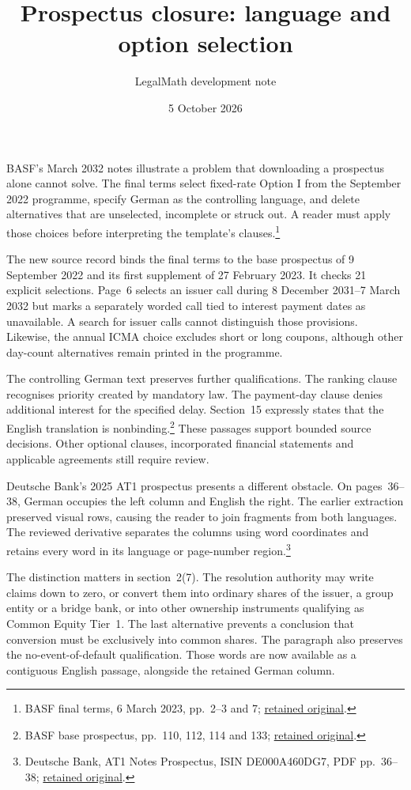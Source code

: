 \documentclass[11pt]{article}
\title{Prospectus closure: language and option selection}
\author{LegalMath development note}
\date{5 October 2026}
\begin{document}
\maketitle
BASF's March 2032 notes illustrate a problem that downloading a prospectus alone
cannot solve. The final terms select fixed-rate Option I from the September 2022
programme, specify German as the controlling language, and delete alternatives
that are unselected, incomplete or struck out. A reader must apply those choices
before interpreting the template's clauses.\footnote{BASF final terms,
6 March 2023, pp.~2--3 and 7; \href{../../../../prospectus/evidence-master/requests/044-basf-final/response.body}{retained original}.}

The new source record binds the final terms to the base prospectus of
9 September 2022 and its first supplement of 27 February 2023. It checks
21 explicit selections. Page~6 selects an issuer call during
8 December 2031--7 March 2032 but marks a separately worded call tied to interest
payment dates as unavailable. A search for issuer calls cannot distinguish those
provisions. Likewise, the annual ICMA choice excludes short or long coupons,
although other day-count alternatives remain printed in the programme.

The controlling German text preserves further qualifications. The ranking clause
recognises priority created by mandatory law. The payment-day clause denies
additional interest for the specified delay. Section~15 expressly states that
the English translation is nonbinding.\footnote{BASF base prospectus,
pp.~110, 112, 114 and 133; \href{../../../../prospectus/evidence-closure/requests/037-basf-base-september-2022-exchange/response.bin}{retained original}.}
These passages support bounded source decisions. Other optional clauses,
incorporated financial statements and applicable agreements still require review.

\newpage
Deutsche Bank's 2025 AT1 prospectus presents a different obstacle. On pages~36--38,
German occupies the left column and English the right. The earlier extraction
preserved visual rows, causing the reader to join fragments from both languages.
The reviewed derivative separates the columns using word coordinates and retains
every word in its language or page-number region.\footnote{Deutsche Bank,
AT1 Notes Prospectus, ISIN DE000A460DG7, PDF pp.~36--38;
\href{../../../../prospectus/classification-additions/originals/deutsche-at1-2025.pdf}{retained original}.}

The distinction matters in section~2(7). The resolution authority may write
claims down to zero, or convert them into ordinary shares of the issuer, a group
entity or a bridge bank, or into other ownership instruments qualifying as
Common Equity Tier~1. The last alternative prevents a conclusion that conversion
must be exclusively into common shares. The paragraph also preserves the
no-event-of-default qualification. Those words are now available as a contiguous
English passage, alongside the retained German column.
\end{document}
